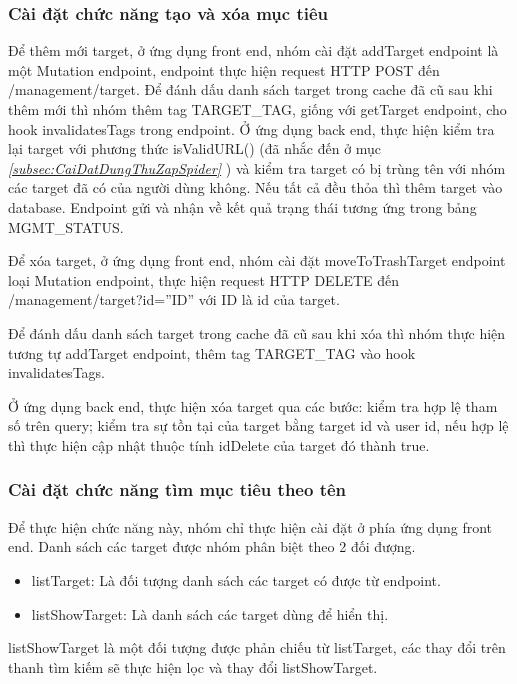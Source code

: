 \subsubsection{Cài đặt chức năng tạo và xóa mục tiêu}

\tab Để thêm mới target, ở ứng dụng front end, nhóm cài đặt addTarget endpoint là một Mutation endpoint, endpoint thực hiện request HTTP POST đến /management/target.
Để đánh dấu danh sách target trong cache đã cũ sau khi thêm mới thì nhóm thêm tag TARGET\_TAG, giống với getTarget endpoint, cho hook invalidatesTags trong endpoint.
Ở ứng dụng back end, thực hiện kiểm tra lại target với phương thức isValidURL() (đã nhắc đến ở mục \textit{\ref{subsec:CaiDatDungThuZapSpider} }) và kiểm tra target có bị trùng tên với nhóm các target đã có của người dùng không. Nếu tất cả đều thỏa thì thêm target vào database. Endpoint gửi và nhận về kết quả trạng thái tương ứng trong bảng MGMT\_STATUS.

Để xóa target, ở ứng dụng front end, nhóm cài đặt moveToTrashTarget endpoint loại Mutation endpoint, thực hiện request HTTP DELETE đến /management/target?id=”ID” với ID là id của target.

Để đánh dấu danh sách target trong cache đã cũ sau khi xóa thì nhóm thực hiện tương tự addTarget endpoint, thêm tag TARGET\_TAG vào hook invalidatesTags.

Ở ứng dụng back end, thực hiện xóa target qua các bước: kiểm tra hợp lệ tham số trên query; kiểm tra sự tồn tại của target bằng target id và user id, nếu hợp lệ thì thực hiện cập nhật thuộc tính idDelete của target đó thành true.

\subsubsection{Cài đặt chức năng tìm mục tiêu theo tên}

\tab Để thực hiện chức năng này, nhóm chỉ thực hiện cài đặt ở phía ứng dụng front end. Danh sách các target được nhóm phân biệt theo 2 đối đượng.

\begin{itemize}
  \item listTarget: Là đối tượng danh sách các target có được từ endpoint.
  \item listShowTarget: Là danh sách các target dùng để hiển thị.
\end{itemize}

listShowTarget là một đối tượng được phản chiếu từ listTarget, các thay đổi trên thanh tìm kiếm sẽ thực hiện lọc và thay đổi listShowTarget.

